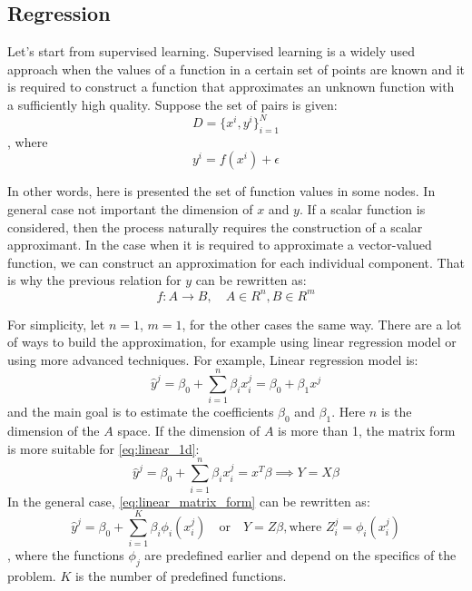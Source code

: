 \subsection{Regression}
Let's start from supervised learning. Supervised learning is a widely used approach when the values of a function in a certain set of points are known and it is required to construct a function that approximates an unknown function with a sufficiently high quality. Suppose the set of pairs is given:
\begin{equation*}
	D = \{ x^i, y^i \}_{i = 1}^N
\end{equation*}
, where 
\begin{equation*}
y^i = f(x^i) + \epsilon
\end{equation*}

In other words, here is presented the set of function values in some nodes. In general case not important the dimension of $x$ and $y$. If a scalar function is considered, then the process naturally requires the construction of a scalar approximant. In the case when it is required to approximate a vector-valued function, we can construct an approximation for each individual component. That is why the previous relation for $y$ can be rewritten as:
\begin{equation*}
	f: A \rightarrow B, \quad A \in R^n, B \in R^m
\end{equation*}

For simplicity, let $n = 1$, $m = 1$, for the other cases the same way.
There are a lot of ways to build the approximation, for example using linear regression model or using more advanced techniques. For example, Linear regression model is:
\begin{equation}
	\label{eq:linear_1d}
	\hat{y}^j = \beta_0 + \sum_{i = 1}^n \beta_i x^j_i = \beta_0 + \beta_1 x^j
\end{equation}
and the main goal is to estimate the coefficients $\beta_0$ and $\beta_1$. Here $n$ is the dimension of the $A$ space. If the dimension of $A$ is more than 1, the matrix form is more suitable for \eqref{eq:linear_1d}:
\begin{equation}
	\label{eq:linear_matrix_form}
	\hat{y}^j = \beta_0 + \sum_{i = 1}^n \beta_i x^j_i = x^T \beta \implies Y = X \beta
\end{equation}
In the general case, \eqref{eq:linear_matrix_form} can be rewritten as:
\begin{equation}
	\label{eq:linear_expansion}
	\hat{y}^j = \beta_0 + \sum_{i = 1}^K \beta_i \phi_i(x^j_i) \quad \text{or} \quad Y = Z \beta, \text{where } Z^j_i = \phi_i(x^j_i)
\end{equation}
, where the functions $\phi_j$ are predefined earlier and depend on the specifics of the problem. $ K $ is the number of predefined functions.

